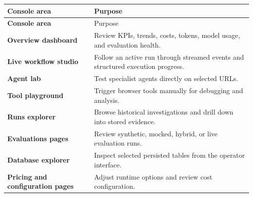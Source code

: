 \begin{longtable}{>{\bfseries}p{4cm}p{9.5cm}}
\toprule
\rowcolor{accent!8}
Console area & Purpose \\
\midrule
\endfirsthead
\toprule
\rowcolor{accent!8}
Console area & Purpose \\
\midrule
\endhead
Overview dashboard & Review KPIs, trends, costs, tokens, model usage, and evaluation health. \\
Live workflow studio & Follow an active run through streamed events and structured execution progress. \\
Agent lab & Test specialist agents directly on selected URLs. \\
Tool playground & Trigger browser tools manually for debugging and analysis. \\
Runs explorer & Browse historical investigations and drill down into stored evidence. \\
Evaluations pages & Review synthetic, mocked, hybrid, or live evaluation runs. \\
Database explorer & Inspect selected persisted tables from the operator interface. \\
Pricing and configuration pages & Adjust runtime options and review cost configuration. \\
\bottomrule
\end{longtable}

